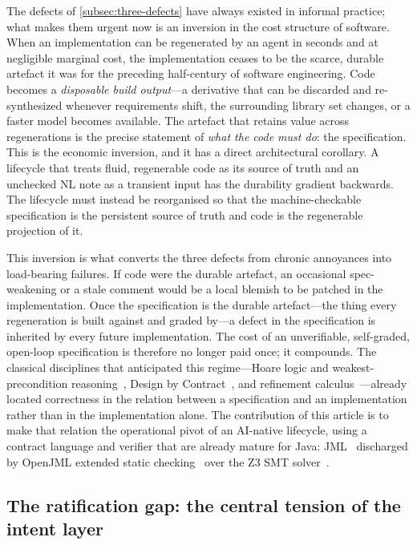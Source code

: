 The defects of \cref{subsec:three-defects} have always existed in informal practice; what makes them urgent now is an inversion in the cost structure of software. When an implementation can be regenerated by an agent in seconds and at negligible marginal cost, the implementation ceases to be the scarce, durable artefact it was for the preceding half-century of software engineering. Code becomes a \emph{disposable build output}---a derivative that can be discarded and re-synthesized whenever requirements shift, the surrounding library set changes, or a faster model becomes available. The artefact that retains value across regenerations is the precise statement of \emph{what the code must do}: the specification. This is the economic inversion, and it has a direct architectural corollary. A lifecycle that treats fluid, regenerable code as its source of truth and an unchecked NL note as a transient input has the durability gradient backwards. The lifecycle must instead be reorganised so that the machine-checkable specification is the persistent source of truth and code is the regenerable projection of it.

This inversion is what converts the three defects from chronic annoyances into load-bearing failures. If code were the durable artefact, an occasional spec-weakening or a stale comment would be a local blemish to be patched in the implementation. Once the specification is the durable artefact---the thing every regeneration is built against and graded by---a defect in the specification is inherited by every future implementation. The cost of an unverifiable, self-graded, open-loop specification is therefore no longer paid once; it compounds. The classical disciplines that anticipated this regime---Hoare logic and weakest-precondition reasoning~\cite{hoare1969axiomatic,dijkstra1976discipline}, Design by Contract~\cite{meyer1992dbc,meyer1997oosc}, and refinement calculus~\cite{back1998refinement,morgan1994programming}---already located correctness in the relation between a specification and an implementation rather than in the implementation alone. The contribution of this article is to make that relation the operational pivot of an AI-native lifecycle, using a contract language and verifier that are already mature for Java: JML~\cite{leavens2006jml} discharged by OpenJML extended static checking~\cite{cok2011openjml,cok2014openjml} over the Z3 SMT solver~\cite{demoura2008z3}.

\subsection{The ratification gap: the central tension of the intent layer}
\label{subsec:ratification-gap}

